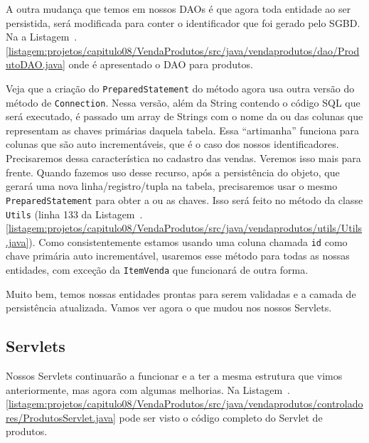A outra mudança que temos em nossos DAOs é que agora toda entidade ao ser persistida, será modificada para conter o identificador que foi gerado pelo SGBD. Na a Listagem~\thechapter.\ref{listagem:projetos/capitulo08/VendaProdutos/src/java/vendaprodutos/dao/ProdutoDAO.java} onde é apresentado o DAO para produtos.


Veja que a criação do \texttt{PreparedStatement} do método  agora usa outra versão do método  de \texttt{Connection}. Nessa versão, além da String contendo o código SQL que será executado, é passado um array de Strings com o nome da ou das colunas que representam as chaves primárias daquela tabela. Essa ``artimanha'' funciona para colunas que são auto incrementáveis, que é o caso dos nossos identificadores. Precisaremos dessa característica no cadastro das vendas. Veremos isso mais para frente. Quando fazemos uso desse recurso, após a persistência do objeto, que gerará uma nova linha/registro/tupla na tabela, precisaremos usar o mesmo \texttt{PreparedStatement} para obter a ou as chaves. Isso será feito no método  da classe \texttt{Utils} (linha 133 da Listagem~\thechapter.\ref{listagem:projetos/capitulo08/VendaProdutos/src/java/vendaprodutos/utils/Utils.java}). Como consistentemente estamos usando uma coluna chamada \texttt{id} como chave primária auto incrementável, usaremos esse método para todas as nossas entidades, com exceção da \texttt{ItemVenda} que funcionará de outra forma.

Muito bem, temos nossas entidades prontas para serem validadas e a camada de persistência atualizada. Vamos ver agora o que mudou nos nossos Servlets.


\subsection{Servlets}

Nossos Servlets continuarão a funcionar e a ter a mesma estrutura que vimos anteriormente, mas agora com algumas melhorias. Na Listagem~\thechapter.\ref{listagem:projetos/capitulo08/VendaProdutos/src/java/vendaprodutos/controladores/ProdutosServlet.java} pode ser visto o código completo do Servlet de produtos.

